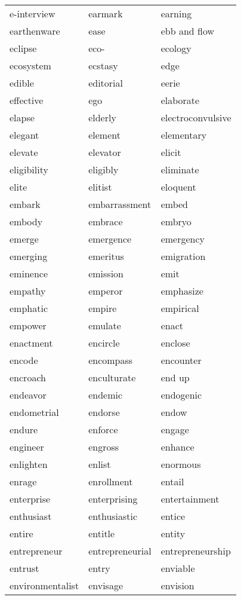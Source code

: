\documentclass{minimal}
\begin{document}
\begin{longtable}{p{2.8cm}p{2.8cm}p{2.8cm}}
e-interview & earmark & earning \\
earthenware & ease & ebb and flow \\
eclipse & eco- & ecology \\
ecosystem & ecstasy & edge \\
edible & editorial & eerie \\
effective & ego & elaborate \\
elapse & elderly & electroconvulsive \\
elegant & element & elementary \\
elevate & elevator & elicit \\
eligibility & eligibly & eliminate \\
elite & elitist & eloquent \\
embark & embarrassment & embed \\
embody & embrace & embryo \\
emerge & emergence & emergency \\
emerging & emeritus & emigration \\
eminence & emission & emit \\
empathy & emperor & emphasize \\
emphatic & empire & empirical \\
empower & emulate & enact \\
enactment & encircle & enclose \\
encode & encompass & encounter \\
encroach & enculturate & end up \\
endeavor & endemic & endogenic \\
endometrial & endorse & endow \\
endure & enforce & engage \\
engineer & engross & enhance \\
enlighten & enlist & enormous \\
enrage & enrollment & entail \\
enterprise & enterprising & entertainment \\
enthusiast & enthusiastic & entice \\
entire & entitle & entity \\
entrepreneur & entrepreneurial & entrepreneurship \\
entrust & entry & enviable \\
environmentalist & envisage & envision \\

\end{longtable}
\end{document}
